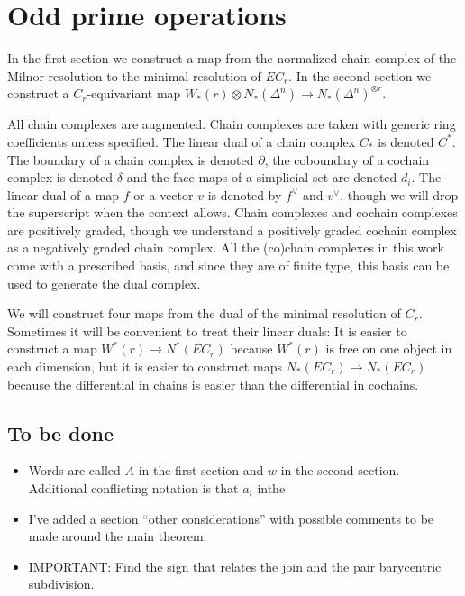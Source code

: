 
\section{Odd prime operations}

In the first section we construct a map from the normalized chain complex of the Milnor resolution to the minimal resolution of $EC_r$.
In the second section we construct a $C_r$-equivariant map $W_*(r)\otimes N_*(\Delta^n)\to N_*(\Delta^n)^{\otimes r}$.

All chain complexes are augmented. Chain complexes are taken with generic ring coefficients unless specified. The linear dual of a chain complex $C_*$ is denoted $C^*$. The boundary of a chain complex is denoted $\partial$, the coboundary of a cochain complex is denoted $\delta$ and the face maps of a simplicial set are denoted $d_i$. The linear dual of a map $f$ or a vector $v$ is denoted by $f^\vee$ and $v^\vee$, though we will drop the superscript when the context allows. Chain complexes and cochain complexes are positively graded, though we understand a positively graded cochain complex as a negatively graded chain complex. All the (co)chain complexes in this work come with a prescribed basis, and since they are of finite type, this basis can be used to generate the dual complex.

We will construct four maps from the dual of the minimal resolution of $C_r$. Sometimes it will be convenient to treat their linear duals: It is easier to construct a map $W^*(r)\to N^*(EC_r)$ because $W^*(r)$ is free on one object in each dimension, but it is easier to construct maps $N_*(EC_r)\to N_*(EC_r)$ because the differential in chains is easier than the differential in cochains.

\subsection*{To be done}
\begin{itemize}
	\item Words are called $A$ in the first section and $w$ in the second section. Additional conflicting notation is that $a_i$ inthe 
	\item I've added a section ``other considerations'' with possible comments to be made around the main theorem.
	\item IMPORTANT: Find the sign that relates the join and the pair barycentric subdivision.
\end{itemize}


